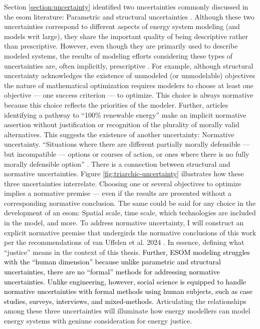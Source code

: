 Section \ref{section:uncertainty} identified two uncertainties commonly
discussed in the \ac{esom} literature: Parametric and structural uncertainties
\cite{decarolis_using_2011}. Although these two uncertainties correspond to
different aspects of energy system modeling (and models writ large), they share
the important quality of being descriptive rather than prescriptive. However,
even though they are primarily used to describe modeled systems, the results of
modeling efforts considering these types of uncertainties are, often implicitly,
prescriptive
\cite{yue_least_2020,decarolis_nc_2018,cochran_la100_2021,bussar_optimal_2014}.
For example, although structural uncertainty acknowledges the existence of
unmodeled (or unmodelable) objectives the nature of mathematical optimization
requires modelers to choose at least one objective --- one success criterion ---
to optimize. This choice is always normative because this choice reflects the
priorities of the modeler. Further, articles identifying a pathway to ``100\%
renewable energy'' make an implicit normative assertion without justification or
recognition of the plurality of morally valid alternatives. This suggests the
existence of another uncertainty: Normative uncertainty. ``Situations where
there are different partially morally defensible --- but incompatible ---
options or courses of action, or ones where there is no fully morally defensible
option'' \cite{taebi_bridging_2017,van_uffelen_revisiting_2024}. There is a
connection between structural and normative uncertainties. Figure
\ref{fig:triarchic-uncertainty} illustrates how these three uncertainties
interrelate. Choosing one or several objectives to optimize implies a normative
premise --- even if the results are presented without a corresponding normative
conclusion. The same could be said for any choice in the development of an
\ac{esom}: Spatial scale, time scale, which technologies are included in the
model, and more. To address normative uncertainty, I will construct an explicit
normative premise that undergirds the normative conclusions of this work per the
recommendations of van Uffelen et al. 2024 \cite{van_uffelen_revisiting_2024}.
In essence, defining what ``justice'' means in the context of this thesis.
\textcolor{black}{Further, ESOM modeling struggles with the ``human dimension''
\cite{pfenninger_energy_2014} because unlike parametric and structural
uncertainties, there are no ``formal'' methods for addressing normative
uncertainties. Unlike engineering, however, social science is equipped to handle
normative uncertainties with formal methods using human subjects, such as case
studies, surveys, interviews, and mixed-methods.} Articulating the relationships
among these three uncertainties will illuminate how energy modellers can model
energy systems with geniune consideration for energy justice.


